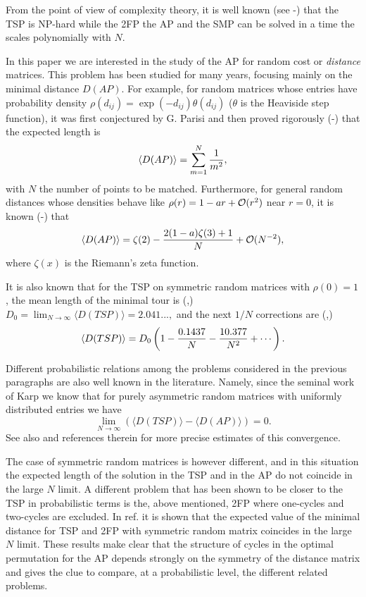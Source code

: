 \documentclass[]{iopart}
\begin{document}
{}From the point of view of complexity theory,
it is well known (see \cite{Papa}-\cite{LP}) that the TSP is  NP-hard 
while the 2FP  the AP  and the SMP 
can be solved in a time the scales polynomially with $N$.

In this paper we are interested in the study of the AP for random cost or
{\it distance} matrices.  
 This problem
 has been studied for many years,
 focusing mainly on the minimal 
 distance ${D(AP)}$.
 For example, for random matrices whose entries have probability density 
 $\rho(d_{{i}{j}})= \exp{(-d_{{i}{j}})}\theta(d_{{i}{j}})$ ($\theta$ is the 
Heaviside step function), it was first conjectured by G. Parisi
 \cite{P1} and then proved rigorously (\cite{prueb1}-\cite{prueb3}) that
the expected length is 
\begin{equation}
\langle{D(AP)}\rangle= \sum_{m=1}^{N} {1 \over m^2},
\end{equation}
 with  $N$ the number of points to be matched. Furthermore,
 for general random distances whose densities  behave like  
$\rho(r)=1-a r + {\cal O}(r^2)$ 
near $r=0$, 
it is known (\cite{P21}-\cite{P4}) that
\begin{equation}
\langle{D(AP)}\rangle= \zeta(2)-{2(1-a)\zeta(3)+1 \over N} + {\cal O}(N^{-2}),
\label{DAP}
\end{equation}
where $\zeta(x)$ is the Riemann's zeta function. 

It is also 
known that  for the TSP on symmetric random matrices with $\rho(0)=1$,
 the mean length of the minimal tour is (\cite{atp1},\cite{P5}) 
$D_0 = \lim_{N\to \infty} \langle{D(TSP)}\rangle= 2.041...,$ 
and the next $1/N$ corrections are (\cite{atp2},\cite{atp3})
\begin{equation}
\langle{D(TSP)}\rangle= D_0 \left( 1-{0.1437\over N} -
{10.377 \over N^2} +\cdots\right).
\end{equation}

Different probabilistic relations 
among the problems considered in the previous paragraphs
are also well known in the literature. Namely, since the seminal work of Karp
\cite{Karp} we know that for purely asymmetric random matrices
with uniformly distributed entries we have
$$\lim_{N\to\infty}(\langle{D(TSP)}\rangle-\langle{D(AP)}\rangle)=0.$$
See also \cite{Frieze} and references therein for more precise
estimates of this convergence.

The case of symmetric random matrices is however different, and in this 
situation the expected length of the solution in the TSP and in the 
AP do not coincide in the large $N$ limit. 
A different problem that has been shown to 
be closer to the TSP in probabilistic terms is 
the, above mentioned, 2FP where one-cycles 
and two-cycles are excluded. 
In ref. \cite{Frieze1} it is shown that the expected value 
of the minimal distance for TSP and 2FP with symmetric random matrix
coincides in the large $N$ limit.
These results make clear that the structure of cycles in the optimal 
permutation for the AP depends strongly on the symmetry of 
the distance matrix and 
gives the clue to compare, at a probabilistic level, the different 
related problems.
\end{document}
